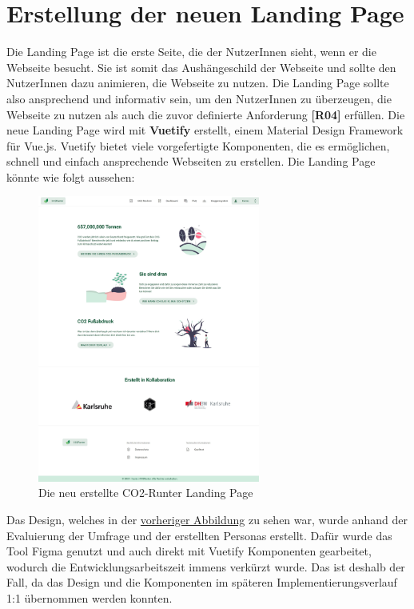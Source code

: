 
\section{Erstellung der neuen Landing Page}

Die Landing Page ist die erste Seite, die der NutzerInnen sieht, wenn er die Webseite besucht.
Sie ist somit das Aushängeschild der Webseite und sollte den NutzerInnen dazu animieren, die Webseite zu nutzen.
Die Landing Page sollte also ansprechend und informativ sein, um den NutzerInnen zu überzeugen, die Webseite zu nutzen als auch die zuvor definierte Anforderung \textbf{[R04]} erfüllen.
Die neue Landing Page wird mit \textbf{Vuetify} erstellt, einem Material Design Framework für Vue.js.
Vuetify bietet viele vorgefertigte Komponenten, die es ermöglichen, schnell und einfach ansprechende Webseiten zu erstellen.
Die Landing Page könnte wie folgt aussehen:

\begin{figure}[H]
    \centering
    \includegraphics[width=0.65\textwidth]{images/06/HomePage-Design.jpeg}
    \caption{Die neu erstellte CO2-Runter Landing Page}
    \label{fig:new-co2runter-homepage-design}
\end{figure}

Das Design, welches in der \hyperref[fig:new-co2runter-homepage-design]{vorheriger Abbildung} zu sehen war, wurde anhand der Evaluierung der Umfrage und der erstellten Personas erstellt.
Dafür wurde das Tool Figma genutzt und auch direkt mit Vuetify Komponenten gearbeitet, wodurch die Entwicklungsarbeitszeit immens verkürzt wurde.
Das ist deshalb der Fall, da das Design und die Komponenten im späteren Implementierungsverlauf 1:1 übernommen werden konnten.

